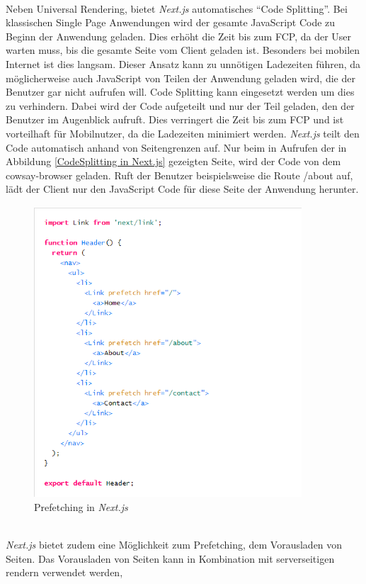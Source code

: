 \documentclass[runningheads]{llncs}
\numberwithin{figure}{section}
\begin{document}
\\
Neben Universal Rendering, bietet \textit{Next.js} automatisches “Code Splitting”. 
Bei klassischen Single Page Anwendungen wird der gesamte JavaScript Code 
zu Beginn der Anwendung geladen. 
Dies erhöht die Zeit bis zum FCP, da der User warten muss, 
bis die gesamte Seite vom Client geladen ist. 
Besonders bei mobilen Internet ist dies langsam. 
Dieser Ansatz kann zu unnötigen Ladezeiten führen, 
da möglicherweise auch JavaScript von Teilen der Anwendung geladen wird, 
die der Benutzer gar nicht aufrufen will. 
Code Splitting kann eingesetzt werden um dies zu verhindern. 
Dabei wird der Code aufgeteilt und nur der Teil geladen, 
den der Benutzer im Augenblick aufruft. 
Dies verringert die Zeit bis zum FCP und ist vorteilhaft für Mobilnutzer, 
da die Ladezeiten minimiert werden.
\textit{Next.js} teilt den Code automatisch anhand von Seitengrenzen auf. 
Nur beim in Aufrufen der in Abbildung \ref{CodeSplitting in Next.js} gezeigten Seite,
wird der Code von dem cowsay-browser geladen.
Ruft der Benutzer beispielsweise die Route /about auf, 
lädt der Client nur den JavaScript Code für diese Seite der Anwendung herunter.
\begin{figure}
  \centering
  \includegraphics[width=10cm]{images/prefetchnext}
  \caption{Prefetching in \textit{Next.js}}
  \label{Prefetching in Next.js}
\end{figure}
\\
\textit{Next.js} bietet zudem eine Möglichkeit zum Prefetching, 
dem Vorausladen von Seiten. 
Das Vorausladen von Seiten kann in Kombination mit serverseitigen rendern verwendet werden, 
\end{document}
